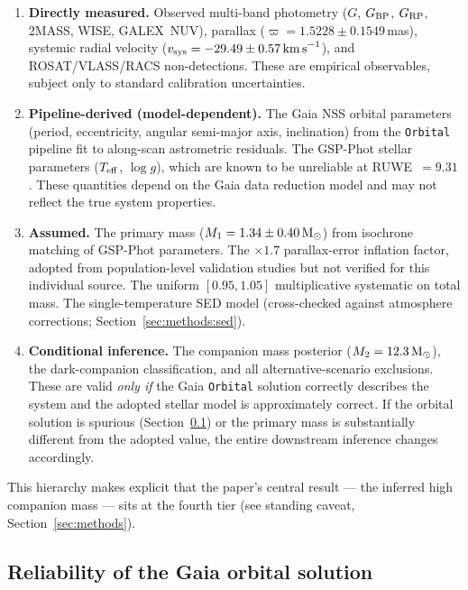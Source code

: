 \documentclass[usenatbib,fleqn]{mnras}
\newcommand{\Msun}{{\rm M}_\odot}
\newcommand{\kms}{{\rm km\,s}^{-1}}
\begin{document}
\begin{enumerate}
\item \textbf{Directly measured.}  Observed multi-band photometry
  ($G$, $G_{\rm BP}$, $G_{\rm RP}$, 2MASS, WISE, GALEX~NUV),
  parallax ($\varpi = 1.5228 \pm 0.1549$\,mas), systemic radial
  velocity ($v_{\rm sys} = -29.49 \pm 0.57\,\kms$), and
  ROSAT/VLASS/RACS non-detections.  These are empirical
  observables, subject only to standard calibration uncertainties.

\item \textbf{Pipeline-derived (model-dependent).}  The Gaia NSS
  orbital parameters (period, eccentricity, angular semi-major
  axis, inclination) from the \texttt{Orbital} pipeline fit to
  along-scan astrometric residuals.  The GSP-Phot stellar parameters
  ($T_{\rm eff}$, $\log g$), which are known to be unreliable at
  RUWE~$= 9.31$ \citep{Andrae2023}.  These quantities depend on
  the Gaia data reduction model and may not reflect the true
  system properties.

\item \textbf{Assumed.}  The primary mass
  ($M_1 = 1.34 \pm 0.40\,\Msun$) from isochrone matching of
  GSP-Phot parameters.  The $\times 1.7$ parallax-error inflation
  factor, adopted from population-level validation studies
  \citep{ElBadry2024} but not verified for this individual source.
  The uniform $[0.95, 1.05]$ multiplicative systematic on total
  mass.  The single-temperature SED model (cross-checked against
  atmosphere corrections; Section~\ref{sec:methods:sed}).

\item \textbf{Conditional inference.}  The companion mass
  posterior ($M_2 = 12.3\,\Msun$), the dark-companion
  classification, and all alternative-scenario exclusions.  These
  are valid \emph{only if} the Gaia \texttt{Orbital} solution
  correctly describes the system and the adopted stellar model is
  approximately correct.  If the orbital solution is spurious
  (Section~\ref{sec:gaia_vetting}) or the primary mass is
  substantially different from the adopted value, the entire
  downstream inference changes accordingly.
\end{enumerate}

\noindent
This hierarchy makes explicit that the paper's central result ---
the inferred high companion mass --- sits at the fourth tier
(see standing caveat, Section~\ref{sec:methods}).

\subsection{Reliability of the Gaia orbital solution}
\label{sec:gaia_vetting}
\end{document}
